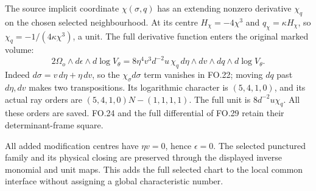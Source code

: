 The source implicit coordinate \(\chi(\sigma,q)\)
has an extending nonzero derivative \(\chi_q\)
on the chosen selected neighbourhood. At its
centre \(H_\chi=-4\chi^3\) and
\(q_\chi=\kappa H_\chi\), so
\(\chi_q=-1/(4\kappa\chi^3)\), a unit.
The full derivative function enters the
original marked volume:
\[
 2\Omega_o\wedge d\epsilon\wedge d\log V_\theta
 =8\eta^4v^3d^{-2}u\,\chi_q\,
     d\eta\wedge dv\wedge dq\wedge d\log V_\theta.
 \tag{FO.31}
\]
Indeed \(d\sigma=v\,d\eta+\eta\,dv\), so the
\(\chi_\sigma d\sigma\) term vanishes in
FO.22; moving \(dq\) past \(d\eta,dv\)
makes two transpositions. Its logarithmic
character is \((5,4,1,0)\), and its actual
ray orders are
\((5,4,1,0)N-(1,1,1,1)\).
The full unit is \(8d^{-2}u\chi_q\).
All these orders are saved. FO.24 and the
full differential of FO.29 retain their
determinant-frame square.

All added modification centres have
\(\eta v=0\), hence \(\epsilon=0\).
The selected punctured family and its
physical closing are preserved through
the displayed inverse monomial and unit
maps. This adds the full selected chart
to the local common interface without
assigning a global characteristic number.

